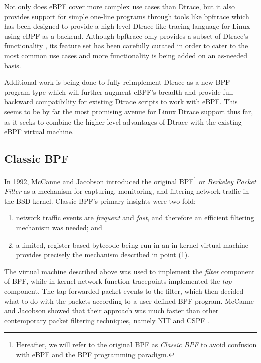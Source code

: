 \documentclass[
  12pt]{findlay}
\begin{document}
Not only does eBPF cover more complex use cases than Dtrace, but it also
provides support for simple one-line programs through tools like
bpftrace \autocite{gregg18,bpftrace} which has been designed to provide
a high-level Dtrace-like tracing language for Linux using eBPF as a
backend. Although bpftrace only provides a subset of Dtrace's
functionality \autocite{gregg18}, its feature set has been carefully
curated in order to cater to the most common use cases and more
functionality is being added on an as-needed basis.

Additional work is being done to fully reimplement Dtrace as a new BPF
program type \autocite{vanhees19} which will further augment eBPF's
breadth and provide full backward compatibility for existing Dtrace
scripts to work with eBPF. This seems to be by far the most promising
avenue for Linux Dtrace support thus far, as it seeks to combine the
higher level advantages of Dtrace with the existing eBPF virtual
machine.

\FloatBarrier

\hypertarget{classic-bpf}{%
\subsection{Classic BPF}\label{classic-bpf}}

In 1992, McCanne and Jacobson \autocite{bpf} introduced the original
BPF\footnote{Hereafter,
we will refer to the original BPF as {\itshape Classic BPF} to avoid confusion with eBPF and the BPF programming paradigm.}
or \emph{Berkeley Packet Filter} as a mechanism for capturing,
monitoring, and filtering network traffic in the BSD kernel. Classic
BPF's primary insights were two-fold:

\begin{enumerate}
\def\labelenumi{(\arabic{enumi})}
\tightlist
\item
  network traffic events are \emph{frequent} and \emph{fast}, and
  therefore an efficient filtering mechanism was needed; and
\item
  a limited, register-based bytecode being run in an in-kernel virtual
  machine provides precisely the mechanism described in point (1).
\end{enumerate}

The virtual machine described above was used to implement the
\emph{filter} component of BPF, while in-kernel network function
tracepoints implemented the \emph{tap} component. The tap forwarded
packet events to the filter, which then decided what to do with the
packets according to a user-defined BPF program. McCanne and Jacobson
showed that their approach was much faster than other contemporary
packet filtering techniques, namely NIT \autocite{nit} and CSPF
\autocite{mogul87}.
\end{document}

